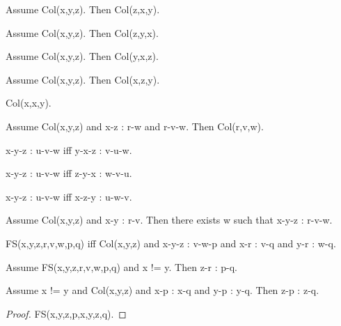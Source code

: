 \documentclass{article}
\begin{document}
\begin{forthel}
    \begin{lemma}[L4_11b]
      Assume Col(x,y,z). Then Col(z,x,y).
    \end{lemma}

    \begin{lemma}[L4_11c]
      Assume Col(x,y,z). Then Col(z,y,x).
    \end{lemma}

    \begin{lemma}[L4_11d]
      Assume Col(x,y,z). Then Col(y,x,z).
    \end{lemma}

    \begin{lemma}[L4_11e]
      Assume Col(x,y,z). Then Col(x,z,y).
    \end{lemma}

    \begin{lemma}[L4_12]
      Col(x,x,y).
    \end{lemma}

    \begin{lemma}[L4_13]
      Assume Col(x,y,z) and x-z : r-w and r-v-w. Then Col(r,v,w).
    \end{lemma}

    \begin{lemma}[L4_14_1]
      x-y-z : u-v-w iff y-x-z : v-u-w.
    \end{lemma}

    \begin{lemma}[L4_14_2]
      x-y-z : u-v-w iff z-y-x : w-v-u.
    \end{lemma}

    \begin{lemma}[L4_14_3]
      x-y-z : u-v-w iff x-z-y : u-w-v.
    \end{lemma}

    \begin{axiom}[L4_14]
      Assume Col(x,y,z) and x-y : r-v. Then there exists w such that
      x-y-z : r-v-w.
    \end{axiom}

    \begin{definition}[L4_15]
      FS(x,y,z,r,v,w,p,q) iff Col(x,y,z) and x-y-z : v-w-p and x-r : v-q and
      y-r : w-q.
    \end{definition}

    \begin{axiom}[L4_16]
      Assume FS(x,y,z,r,v,w,p,q) and x != y. Then z-r : p-q.
    \end{axiom}


    \begin{lemma}[L4_17]
      Assume x != y and Col(x,y,z) and x-p : x-q and y-p :  y-q. Then z-p : z-q.
    \end{lemma}
    \begin{proof}
    	FS(x,y,z,p,x,y,z,q).
    \end{proof}



\end{forthel}
\end{document}
